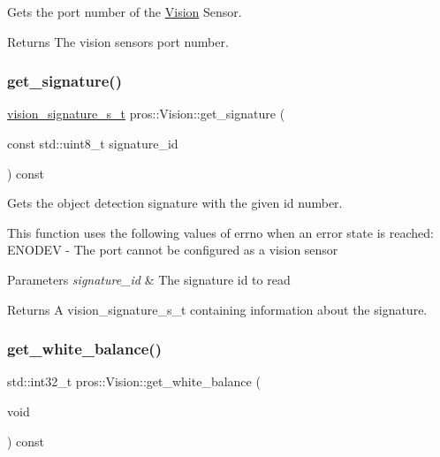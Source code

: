 Gets the port number of the \hyperlink{classpros_1_1Vision}{Vision} Sensor.

\begin{DoxyReturn}{Returns}
The vision sensor\textquotesingle{}s port number. 
\end{DoxyReturn}
\mbox{\label{classpros_1_1Vision_af1d1bc18fd7dacfd23d9dfc403b7d419}} 
\subsubsection{\texorpdfstring{get\+\_\+signature()}{get\_signature()}}
{\footnotesize\ttfamily \hyperlink{vision_8h_a135c729c7277f6cc019c2924088a5fd5}{vision\+\_\+signature\+\_\+s\+\_\+t} pros\+::\+Vision\+::get\+\_\+signature (\begin{DoxyParamCaption}\item[{const std\+::uint8\+\_\+t}]{signature\+\_\+id }\end{DoxyParamCaption}) const}

Gets the object detection signature with the given id number.

This function uses the following values of errno when an error state is reached\+: E\+N\+O\+D\+EV -\/ The port cannot be configured as a vision sensor


\begin{DoxyParams}{Parameters}
{\em signature\+\_\+id} & The signature id to read\\
\hline
\end{DoxyParams}
\begin{DoxyReturn}{Returns}
A vision\+\_\+signature\+\_\+s\+\_\+t containing information about the signature. 
\end{DoxyReturn}
\mbox{\label{classpros_1_1Vision_a7a89ad6812bfd46e24e69e1dc2f55039}} 
\subsubsection{\texorpdfstring{get\+\_\+white\+\_\+balance()}{get\_white\_balance()}}
{\footnotesize\ttfamily std\+::int32\+\_\+t pros\+::\+Vision\+::get\+\_\+white\+\_\+balance (\begin{DoxyParamCaption}\item[{void}]{ }\end{DoxyParamCaption}) const}

